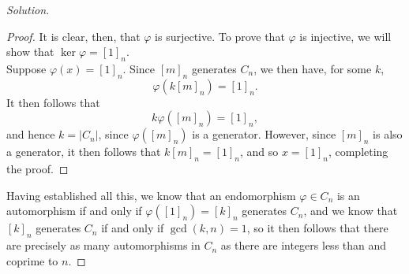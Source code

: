 \documentclass[12pt]{article}
\newenvironment{solution}
  {\renewcommand\qedsymbol{$\blacksquare$}\begin{proof}[Solution]}
{\end{proof}}
\newenvironment{sproof}{
  \renewcommand\qedsymbol{$\square$}
  \begin{proof}
  }{
  \end{proof}
}
\begin{document}
\begin{solution}
\begin{sproof}
    It is clear, then, that $\varphi$ is surjective. 
    To prove that $\varphi$ is injective, we will show that $\ker \varphi = {[1]_n}$.\\
    Suppose $\varphi(x) = [1]_n$. 
    Since $[m]_n$ generates $C_n$, we then have, for some $k$, \\
    \begin{equation*}
      \varphi(k[m]_n) = [1]_n.
    \end{equation*}
    It then follows that 
    \begin{equation*}
      k\varphi([m]_n)=[1]_n,
    \end{equation*}
    and hence $k=|C_n|$, since $\varphi([m]_n)$ is a generator.
    However, since $[m]_n$ is also a generator, it then follows that
    $k[m]_n=[1]_n$, and so $x=[1]_n$, completing the proof.
  \end{sproof}
  Having established all this, we know that an endomorphism $\varphi\in C_n$ is an automorphism
  if and only if $\varphi([1]_n) = [k]_n$ generates $C_n$, 
  and we know that $[k]_n$ generates $C_n$ if and only if $\gcd(k,n)=1$,
  so it then follows that there are precisely as many automorphisms in $C_n$ as there are
  integers less than and coprime to $n$.
\end{solution}
\end{document}
